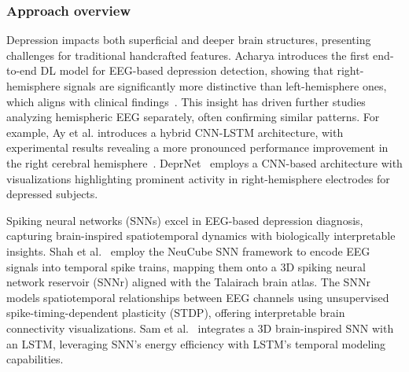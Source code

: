 \subsubsection{Approach overview}
Depression impacts both superficial and deeper brain structures, presenting challenges for traditional handcrafted features.
Acharya introduces the first end-to-end DL model for EEG-based depression detection, showing that right-hemisphere signals are significantly more distinctive than left-hemisphere ones, which aligns with clinical findings~\cite{acharya2018automated}. 
This insight has driven further studies analyzing hemispheric EEG separately, often confirming similar patterns. For example, 
Ay et al. introduces a hybrid CNN-LSTM architecture, with experimental results revealing a more pronounced performance improvement in the right cerebral hemisphere~\cite{ay2019automated}.
DeprNet~\cite{seal2021deprnet} employs a CNN-based architecture with visualizations highlighting prominent activity in right-hemisphere electrodes for depressed subjects.

Spiking neural networks (SNNs) excel in EEG-based depression diagnosis, capturing brain-inspired spatiotemporal dynamics with biologically interpretable insights. 
Shah et al.~\cite{shah2019deep} employ the NeuCube SNN framework to encode EEG signals into temporal spike trains, mapping them onto a 3D spiking neural network reservoir (SNNr) aligned with the Talairach brain atlas.
The SNNr models spatiotemporal relationships between EEG channels using unsupervised spike-timing-dependent plasticity (STDP), offering interpretable brain connectivity visualizations.
Sam et al.~\cite{sam2023depression} integrates a 3D brain-inspired SNN with an LSTM, leveraging SNN’s energy efficiency with LSTM’s temporal modeling capabilities.


